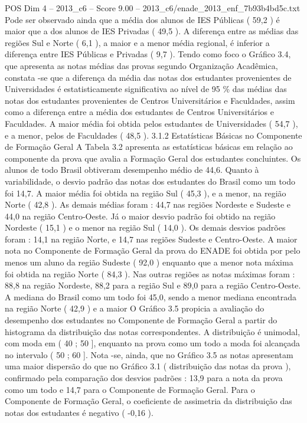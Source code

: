 \begin{textsample}{POS Dim 4 – 2013\_c6 – Score 9.00 – 2013\_c6/enade\_2013\_enf\_7b93b4bd5c.txt}
Pode ser observado ainda que a média dos alunos de IES Públicas ( 59,2 ) é maior que a dos alunos de IES Privadas ( 49,5 ).
A diferença entre as médias das regiões Sul e Norte ( 6,1 ), a maior e a menor média regional, é inferior a diferença entre IES Públicas e Privadas ( 9,7 ).
Tendo como foco o Gráfico 3.4, que apresenta as notas médias das provas segundo Organização Acadêmica, constata -se que a diferença da média das notas dos estudantes provenientes de Universidades é estatisticamente significativa ao nível de 95 \% das médias das notas dos estudantes provenientes de Centros Universitários e Faculdades, assim como a diferença entre a média dos estudantes de Centros Universitários e Faculdades.
A maior média foi obtida pelos estudantes de Universidades ( 54,7 ), e a menor, pelos de Faculdades ( 48,5 ). 3.1.2 Estatísticas Básicas no Componente de Formação Geral A Tabela 3.2 apresenta as estatísticas básicas em relação ao componente da prova que avalia a Formação Geral dos estudantes concluintes.
Os alunos de todo Brasil obtiveram desempenho médio de 44,6.
Quanto à variabilidade, o desvio padrão das notas dos estudantes do Brasil como um todo foi 14,7.
A maior média foi obtida na região Sul ( 45,3 ), e a menor, na região Norte ( 42,8 ).
As demais médias foram : 44,7 nas regiões Nordeste e Sudeste e 44,0 na região Centro-Oeste.
Já o maior desvio padrão foi obtido na região Nordeste ( 15,1 ) e o menor na região Sul ( 14,0 ).
Os demais desvios padrões foram : 14,1 na região Norte, e 14,7 nas regiões Sudeste e Centro-Oeste.
A maior nota no Componente de Formação Geral da prova do ENADE foi obtida por pelo menos um aluno da região Sudeste ( 92,0 ) enquanto que a menor nota máxima foi obtida na região Norte ( 84,3 ).
Nas outras regiões as notas máximas foram : 88,8 na região Nordeste, 88,2 para a região Sul e 89,0 para a região Centro-Oeste.
A mediana do Brasil como um todo foi 45,0, sendo a menor mediana encontrada na região Norte ( 42,9 ) e a maior O Gráfico 3.5 propicia a avaliação do desempenho dos estudantes no Componente de Formação Geral a partir do histograma da distribuição das notas correspondentes.
A distribuição é unimodal, com moda em ( 40 ; 50 ], enquanto na prova como um todo a moda foi alcançada no intervalo ( 50 ; 60 ].
Nota -se, ainda, que no Gráfico 3.5 as notas apresentam uma maior dispersão do que no Gráfico 3.1 ( distribuição das notas da prova ), confirmado pela comparação dos desvios padrões : 13,9 para a nota da prova como um todo e 14,7 para o Componente de Formação Geral.
Para o Componente de Formação Geral, o coeficiente de assimetria da distribuição das notas dos estudantes é negativo ( -0,16 ).

\end{textsample}
